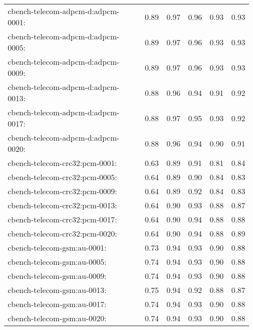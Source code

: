 \begin{table}
\begin{tabular}{lrrrrr}
cbench-telecom-adpcm-d:adpcm-0001: & 0.89 & 0.97 & 0.96 & 0.93 & 0.93 \\
cbench-telecom-adpcm-d:adpcm-0005: & 0.89 & 0.97 & 0.96 & 0.93 & 0.93 \\
cbench-telecom-adpcm-d:adpcm-0009: & 0.89 & 0.97 & 0.96 & 0.93 & 0.93 \\
cbench-telecom-adpcm-d:adpcm-0013: & 0.88 & 0.96 & 0.94 & 0.91 & 0.92 \\
cbench-telecom-adpcm-d:adpcm-0017: & 0.88 & 0.97 & 0.95 & 0.93 & 0.92 \\
cbench-telecom-adpcm-d:adpcm-0020: & 0.88 & 0.96 & 0.94 & 0.90 & 0.91 \\
cbench-telecom-crc32:pcm-0001: & 0.63 & 0.89 & 0.91 & 0.81 & 0.84 \\
cbench-telecom-crc32:pcm-0005: & 0.64 & 0.89 & 0.90 & 0.84 & 0.83 \\
cbench-telecom-crc32:pcm-0009: & 0.64 & 0.89 & 0.92 & 0.84 & 0.83 \\
cbench-telecom-crc32:pcm-0013: & 0.64 & 0.90 & 0.93 & 0.88 & 0.87 \\
cbench-telecom-crc32:pcm-0017: & 0.64 & 0.90 & 0.94 & 0.88 & 0.88 \\
cbench-telecom-crc32:pcm-0020: & 0.64 & 0.90 & 0.94 & 0.88 & 0.89 \\
cbench-telecom-gsm:au-0001: & 0.73 & 0.94 & 0.93 & 0.90 & 0.88 \\
cbench-telecom-gsm:au-0005: & 0.74 & 0.94 & 0.93 & 0.90 & 0.88 \\
cbench-telecom-gsm:au-0009: & 0.74 & 0.94 & 0.93 & 0.90 & 0.88 \\
cbench-telecom-gsm:au-0013: & 0.75 & 0.94 & 0.92 & 0.88 & 0.87 \\
cbench-telecom-gsm:au-0017: & 0.74 & 0.94 & 0.93 & 0.90 & 0.88 \\
cbench-telecom-gsm:au-0020: & 0.74 & 0.94 & 0.93 & 0.90 & 0.88 \\
\bottomrule
\end{tabular}
\end{table}
